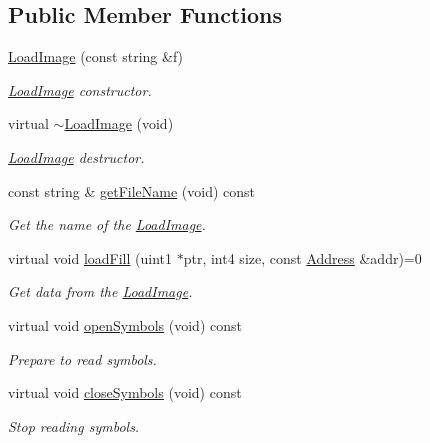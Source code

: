 \subsection*{Public Member Functions}
\begin{DoxyCompactItemize}
\item 
\mbox{\hyperlink{class_load_image_a4fc6f708cad0202b134c79069af89cc3}{Load\+Image}} (const string \&f)
\begin{DoxyCompactList}\small\item\em \mbox{\hyperlink{class_load_image}{Load\+Image}} constructor. \end{DoxyCompactList}\item 
virtual \mbox{\hyperlink{class_load_image_a7818613254abfa992691eedfc33fbe28}{$\sim$\+Load\+Image}} (void)
\begin{DoxyCompactList}\small\item\em \mbox{\hyperlink{class_load_image}{Load\+Image}} destructor. \end{DoxyCompactList}\item 
const string \& \mbox{\hyperlink{class_load_image_add06668a3a1b9c47ed9fe671b656b4a4}{get\+File\+Name}} (void) const
\begin{DoxyCompactList}\small\item\em Get the name of the \mbox{\hyperlink{class_load_image}{Load\+Image}}. \end{DoxyCompactList}\item 
virtual void \mbox{\hyperlink{class_load_image_af00d3957284bf0b4721be0ada5ef4328}{load\+Fill}} (uint1 $\ast$ptr, int4 size, const \mbox{\hyperlink{class_address}{Address}} \&addr)=0
\begin{DoxyCompactList}\small\item\em Get data from the \mbox{\hyperlink{class_load_image}{Load\+Image}}. \end{DoxyCompactList}\item 
virtual void \mbox{\hyperlink{class_load_image_a5b17f1d68413ab802966bdc7aa07cc73}{open\+Symbols}} (void) const
\begin{DoxyCompactList}\small\item\em Prepare to read symbols. \end{DoxyCompactList}\item 
virtual void \mbox{\hyperlink{class_load_image_a58c86c5342b7500e317ba98bcbf66753}{close\+Symbols}} (void) const
\begin{DoxyCompactList}\small\item\em Stop reading symbols. \end{DoxyCompactList}\item 

\end{DoxyCompactItemize}
